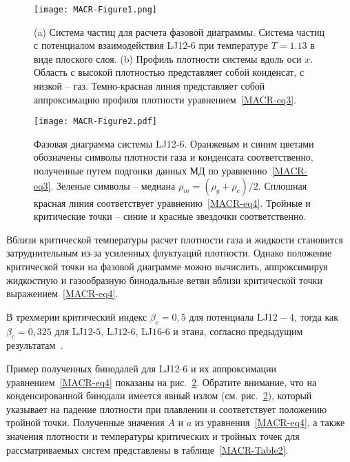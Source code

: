 \begin{figure}[!t]
  \centering
  \texttt{[image: MACR-Figure1.png]}
  \caption{(a) Система частиц для расчета фазовой диаграммы.
    Система частиц с потенциалом взаимодействия LJ12-6 при температуре $T=1.13$ в виде плоского слоя.
    (b) Профиль плотности системы вдоль оси $x$.
    Область с высокой плотностью представляет собой конденсат, с низкой -- газ.
    Темно-красная линия представляет собой аппроксимацию профиля плотности уравнением~\eqref{MACR-eq3}.}
  \label{MACR-Figure1}
\end{figure}


\begin{figure}[!t]
  \centering
  \texttt{[image: MACR-Figure2.pdf]}
  \caption{Фазовая диаграмма системы LJ12-6.
    Оранжевым и синим цветами обозначены символы плотности газа и конденсата соответственно, полученные путем подгонки данных МД по уравнению~\eqref{MACR-eq3}.
    Зеленые символы -- медиана $\rho_m=(\rho_g+\rho_c)/2$.
    Сплошная красная линия соответствует уравнению~\eqref{MACR-eq4}.
    Тройные и критические точки -- синие и красные звездочки соответственно.
  }
  \label{MACR-Figure2}
\end{figure}

Вблизи критической температуры расчет плотности газа и жидкости становится затруднительным из-за усиленных флуктуаций плотности.
Однако положение критической точки на фазовой диаграмме можно вычислить, аппроксимируя жидкостную и газообразную бинодальные ветви вблизи критической точки выражением~\ref{MACR-eq4}.

В трехмерии критический индекс $\beta_c = 0,5$ для потенциала LJ$12-4$, тогда как $\beta_c = 0,325$ для LJ$12$-$5$, LJ$12$-$6$, LJ$16$-$6$ и этана, согласно предыдущим результатам~\cite{10.1021/acs.jced.6b01036,10.1021/jp9072137,10.1103/physrevlett.89.025703}.

Пример полученных бинодалей для LJ12-6 и их аппроксимации уравнением~\eqref{MACR-eq4} показаны на рис.~\ref{MACR-Figure2}.
Обратите внимание, что на конденсированной бинодали имеется явный излом (см. рис.~\ref{MACR-Figure2}), который указывает на падение плотности при плавлении и соответствует положению тройной точки.
Полученные значения $A$ и $a$ из уравнения~\eqref{MACR-eq4}, а также значения плотности и температуры критических и тройных точек для рассматриваемых систем представлены в таблице~\ref{MACR-Table2}.

